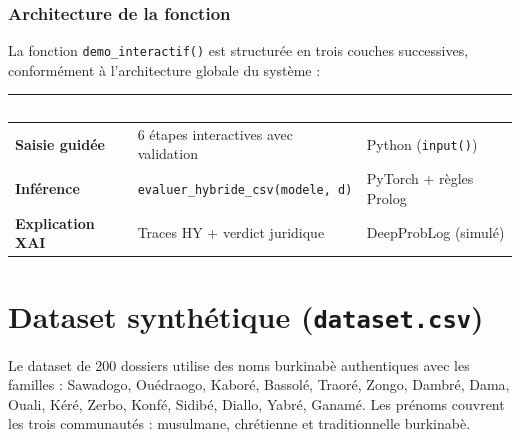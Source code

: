 \documentclass[11pt,a4paper]{report}
\begin{document}
\subsubsection*{Architecture de la fonction}

La fonction \texttt{demo\_interactif()} est structurée en trois
couches successives, conformément à l'architecture globale du système :

\begin{center}
\begin{tabular}{>{\bfseries}p{3cm} p{5cm} p{6cm}}
\toprule
\rowcolor{tablehead}\textcolor{white}{Couche} &
\textcolor{white}{Fonction} &
\textcolor{white}{Technologie activée} \\
\midrule
Saisie guidée   & 6 étapes interactives avec validation & Python (\texttt{input()}) \\
Inférence       & \texttt{evaluer\_hybride\_csv(modele, d)} & PyTorch + règles Prolog \\
Explication XAI & Traces HY + verdict juridique & DeepProbLog (simulé) \\
\bottomrule
\end{tabular}
\end{center}

\vspace{0.5cm}
\begin{center}
\end{center}

\section{Dataset synthétique (\texttt{dataset.csv})}

Le dataset de 200 dossiers utilise des noms burkinabè authentiques avec les familles :
Sawadogo, Ouédraogo, Kaboré, Bassolé, Traoré, Zongo, Dambré, Dama, Ouali, Kéré,
Zerbo, Konfé, Sidibé, Diallo, Yabré, Ganamé. Les prénoms couvrent les trois
communautés : musulmane, chrétienne et traditionnelle burkinabè.
\end{document}
